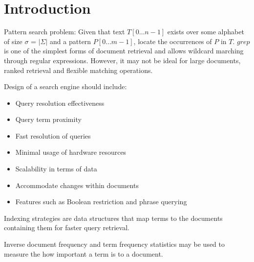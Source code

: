 \section{Introduction}
\label{sec-intro}

Pattern search problem: Given that text $T[0\ldots n{-}1]$ exists over some alphabet of size $\sigma$ = $\mid$$\Sigma$$\mid$
and a pattern $P[0\ldots m{-}1]$, locate the occurrences of $P$ in $T$. $grep$ is one of the simplest forms of document retrieval 
and allows wildcard marching through regular expressions. However, it may not be ideal for large documents, ranked retrieval and flexible matching operations.

Design of a search engine should include: 
\begin{itemize}
  \item Query resolution effectiveness
  \item Query term proximity 
  \item Fast resolution of queries 
  \item Minimal usage of hardware resources 
  \item Scalability in terms of data
  \item Accommodate changes within documents
  \item Features such as Boolean restriction and phrase querying
\end{itemize}

Indexing strategies are data structures that map terms to the documents containing them for faster query retrieval.
\iffalse

\texttt Similarity measures may be defined as follows: 
\begin{itemize}
  \item $f$$_{d,t}$, the frequency of term t in document d;
  \iffalse
  \item f$_{q,t}$, the frequency of term t in the query;
  \item f$_{t}$, the number of documents containing one or more occurrences of term t;
  \item F$_{t}$, the number of occurrences of term t in the collection;
  \fi 
  \item $N$, the number of documents in the collection; and
  \item $n$, the number of indexed terms in the collection.
\end{itemize}
\fi
Inverse document frequency and term frequency statistics may be used to measure the how important a term is to a document.




